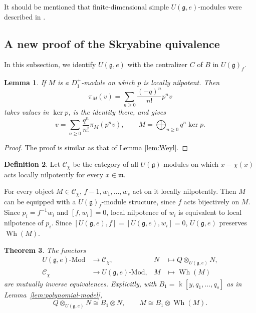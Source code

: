 \documentclass[12pt,a4paper]{amsart}
\numberwithin{equation}{section}
\newtheorem{theorem}{Theorem}[section]
\newtheorem{lemma}[theorem]{Lemma}
\theoremstyle{definition}
\newtheorem{definition}[theorem]{Definition}
\theoremstyle{remark}
\newcommand{\kk}{\Bbbk}
\newcommand{\g}{\mathfrak g}
\newcommand{\m}{\mathfrak m}
\newcommand{\Wh}{\operatorname{Wh}}
\newcommand{\Uf}{U(\g)_f}
\newcommand{\Cchi}{\mathcal C_\chi}
\begin{document}
It should be mentioned that finite-dimensional simple
$U(\g,e)$-modules were described in \cite{Pr2}.

\subsection{A new proof of the Skryabine quivalence}

In this subsection, we identify $U(\g,e)$ with the centralizer $C$ of
$B$ in $\Uf$.

\begin{lemma}\label{lem:module-Taylor}
If \(M\) is a $D^+_1$-module on which  \(p\) is locally nilpotent.
Then
\[
 \pi_M(v)=\sum_{n\geq0}\frac{(-q)^n}{n!}p^nv
\]
takes values in \(\ker p\), is the identity there, and gives
\[
 v=\sum_{n\geq0}\frac{q^n}{n!}\pi_M(p^nv),\qquad
 M=\bigoplus_{n\geq0}q^n\ker p.
\]
\end{lemma}

\begin{proof}The proof is similar as that of Lemma \ref{lem:Weyl}.
\end{proof}



\begin{definition}\label{def:Wh-category}
Let \(\Cchi\) be the category of all \(U(\g)\)-modules on which
\(x-\chi(x)\) acts locally nilpotently for every \(x\in\m\).
\end{definition}

For every object $M\in \Cchi$,
\(f-1,w_1,\ldots,w_s\) act on it locally nilpotently.
Then $M$ can be equipped with a \(\Uf\)-module structure, since  \(f\) acts bijectively on $M$.
Since \(p_i=f^{-1}w_i\) and \([f,w_i]=0\), local nilpotence of
\(w_i\) is equivalent to local nilpotence of \(p_i\).
Since $[U(\g,e),f]=[U(\g,e),w_i]=0$,  \(U(\g,e)\) preserves \(\Wh(M)\).

\begin{theorem}\cite{S}\label{thm:elementary-Skryabin}
The functors
\begin{equation}\label{eq:Wh-equivalence}
 \begin{aligned}
 U(\g,e)\text{-}\mathrm{Mod}&\longrightarrow\Cchi,
       &N&\longmapsto Q\otimes_{U(\g,e)} N,\\
 \Cchi&\longrightarrow U(\g,e)\text{-}\mathrm{Mod},
       &M&\longmapsto\Wh(M)
 \end{aligned}
\end{equation}
are mutually inverse equivalences. Explicitly, with
\(B_1=\kk[y,q_1,\ldots,q_s]\) as in
Lemma~\ref{lem:polynomial-model},
\begin{equation}\label{eq:Wh-module-factor}
 Q\otimes_{U(\g,e)} N\cong B_1\otimes N,\qquad
 M\cong B_1\otimes\Wh(M).
\end{equation}
\end{theorem}
\end{document}
